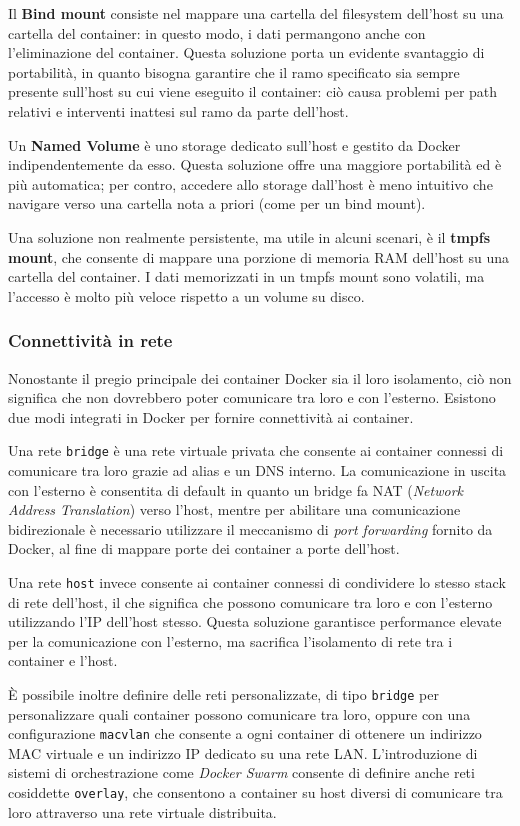 Il \textbf{Bind mount} consiste nel mappare una cartella del filesystem dell'host su una cartella del container: in questo modo, i dati permangono anche con l'eliminazione del container. Questa soluzione porta un evidente svantaggio di portabilità, in quanto bisogna garantire che il ramo specificato sia sempre presente sull'host su cui viene eseguito il container: ciò causa problemi per path relativi e interventi inattesi sul ramo da parte dell'host.

Un \textbf{Named Volume} è uno storage dedicato sull'host e gestito da Docker indipendentemente da esso. Questa soluzione offre una maggiore portabilità ed è più automatica; per contro, accedere allo storage dall'host è meno intuitivo che navigare verso una cartella nota a priori (come per un bind mount).

Una soluzione non realmente persistente, ma utile in alcuni scenari, è il \textbf{tmpfs mount}, che consente di mappare una porzione di memoria RAM dell'host su una cartella del container. I dati memorizzati in un tmpfs mount sono volatili, ma l'accesso è molto più veloce rispetto a un volume su disco.

\subsubsection{Connettività in rete}
Nonostante il pregio principale dei container Docker sia il loro isolamento, ciò non significa che non dovrebbero poter comunicare tra loro e con l'esterno. Esistono due modi integrati in Docker per fornire connettività ai container.

Una rete \texttt{bridge} è una rete virtuale privata che consente ai container connessi di comunicare tra loro grazie ad alias e un DNS interno. La comunicazione in uscita con l'esterno è consentita di default in quanto un bridge fa NAT (\emph{Network Address Translation}) verso l'host, mentre per abilitare una comunicazione bidirezionale è necessario utilizzare il meccanismo di \emph{port forwarding} fornito da Docker, al fine di mappare porte dei container a porte dell'host.

Una rete \texttt{host} invece consente ai container connessi di condividere lo stesso stack di rete dell'host, il che significa che possono comunicare tra loro e con l'esterno utilizzando l'IP dell'host stesso. Questa soluzione garantisce performance elevate per la comunicazione con l'esterno, ma sacrifica l'isolamento di rete tra i container e l'host.

È possibile inoltre definire delle reti personalizzate, di tipo \texttt{bridge} per personalizzare quali container possono comunicare tra loro, oppure con una configurazione \texttt{macvlan} che consente a ogni container di ottenere un indirizzo MAC virtuale e un indirizzo IP dedicato su una rete LAN. L'introduzione di sistemi di orchestrazione come \emph{Docker Swarm} consente di definire anche reti cosiddette \texttt{overlay}, che consentono a container su host diversi di comunicare tra loro attraverso una rete virtuale distribuita.

